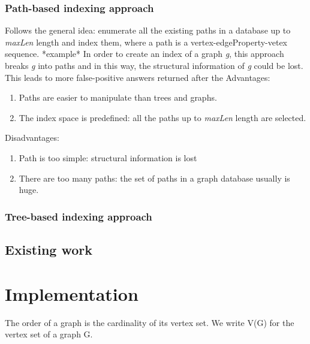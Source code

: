 \documentclass{l4proj}
\theoremstyle{definition}
\begin{document}
        \subsection{Path-based indexing approach}
        Follows the general idea: enumerate all the existing paths in a database up to \textit{maxLen} length and index them, where a path is a vertex-edgeProperty-vetex sequence. *example*
        In order to create an index of a graph \textit{g}, this approach breaks \textit{g} into paths and in this way, the structural information of \textit{g} could be lost. This leads to more false-positive answers returned after the   
        Advantages:
        \begin{enumerate}
            \item Paths are easier to manipulate than trees and graphs.
            \item The index space is predefined: all the paths up to             \textit{maxLen} length are selected.
        \end{enumerate}
        
        Disadvantages:
        \begin{enumerate}
            \item Path is too simple: structural information is lost
            \item There are too many paths: the set of paths in a graph database usually is huge.
        \end{enumerate}
        
        
        \subsection{Tree-based indexing approach}
   \section{Existing work}
        
\chapter{Implementation}

The order of a graph is the cardinality of its
vertex set. We write V(G) for the vertex set of a graph G.
\end{document}
